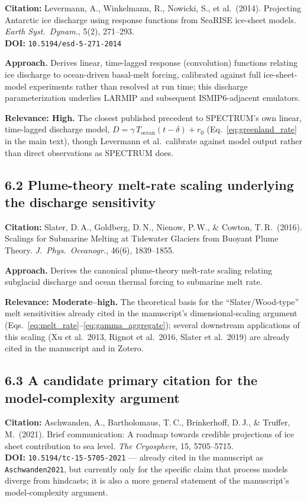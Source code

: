 \documentclass[11pt]{article}
\begin{document}
\noindent\textbf{Citation:} Levermann, A., Winkelmann, R., Nowicki, S.,
et al.\ (2014). Projecting Antarctic ice discharge using response functions
from SeaRISE ice-sheet models. \textit{Earth Syst.\ Dynam.}, 5(2), 271--293.\\
\textbf{DOI:} \texttt{10.5194/esd-5-271-2014}

\noindent\textbf{Approach.} Derives linear, time-lagged response
(convolution) functions relating ice discharge to ocean-driven basal-melt
forcing, calibrated against full ice-sheet-model experiments rather than
resolved at run time; this discharge parameterization underlies LARMIP and
subsequent ISMIP6-adjacent emulators.

\noindent\textbf{Relevance: High.} The closest published precedent to
SPECTRUM's own linear, time-lagged discharge model,
$D = \gamma\,T_{\mathrm{ocean}}(t-\delta) + r_0$
(Eq.~\ref{eq:greenland_rate} in the main text), though Levermann et al.\
calibrate against model output rather than direct observations as SPECTRUM
does.

\subsection*{6.2 Plume-theory melt-rate scaling underlying the discharge sensitivity}

\noindent\textbf{Citation:} Slater, D.\,A., Goldberg, D.\,N.,
Nienow, P.\,W., \& Cowton, T.\,R.\ (2016). Scalings for Submarine Melting at
Tidewater Glaciers from Buoyant Plume Theory. \textit{J.\ Phys.\
Oceanogr.}, 46(6), 1839--1855.

\noindent\textbf{Approach.} Derives the canonical plume-theory melt-rate
scaling relating subglacial discharge and ocean thermal forcing to submarine
melt rate.

\noindent\textbf{Relevance: Moderate--high.} The theoretical basis for the
``Slater/Wood-type'' melt sensitivities already cited in the manuscript's
dimensional-scaling argument (Eqs.~\ref{eq:melt_rate}--\ref{eq:gamma_aggregate});
several downstream applications of this scaling (Xu et al.\ 2013,
Rignot et al.\ 2016, Slater et al.\ 2019) are already cited in the
manuscript and in Zotero.

\subsection*{6.3 A candidate primary citation for the model-complexity argument}

\noindent\textbf{Citation:} Aschwanden, A., Bartholomaus, T.\,C.,
Brinkerhoff, D.\,J., \& Truffer, M.\ (2021). Brief communication: A roadmap
towards credible projections of ice sheet contribution to sea level.
\textit{The Cryosphere}, 15, 5705--5715. \\
\textbf{DOI:} \texttt{10.5194/tc-15-5705-2021} --- already cited in the
manuscript as \texttt{Aschwanden2021}, but currently only for the specific
claim that process models diverge from hindcasts; it is also a more general
statement of the manuscript's model-complexity argument.
\end{document}
